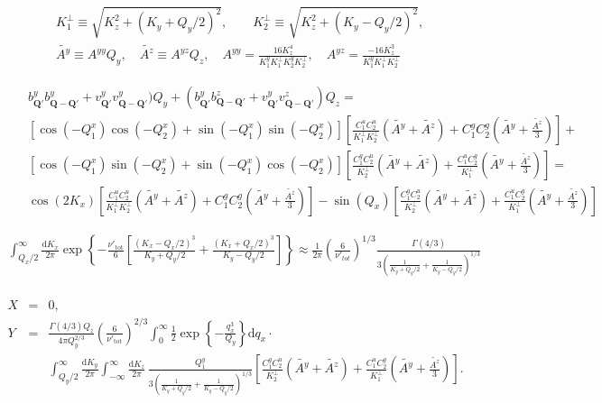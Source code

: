 \documentclass[prb,singlecolumn]{revtex4}
\begin{document}
\begin{eqnarray}
 && K_1^\perp \equiv \sqrt{K_z^2 + (K_y+Q_y/2)^2},\qquad  K_2^\perp \equiv \sqrt{K_z^2 + (K_y-Q_y/2)^2}, \\
 && \tilde{A^y} \equiv A^{yy}Q_y,\quad \tilde{A^z} \equiv A^{yz}Q_z,\quad A^{yy} = \frac{16K_z^4}{K_1^y K_1^\perp K_2^y K_2^\perp}   , \quad A^{yz} = \frac{-16K_z^3}{K_1^y K_1^\perp K_2^\perp}
\end{eqnarray}


\begin{eqnarray}
 && b_{\mathbf{Q}'}^yb_{\mathbf{Q}-\mathbf{Q}'}^y + v_{\mathbf{Q}'}^yv_{\mathbf{Q}-\mathbf{Q}'}^y)Q_y + (b_{\mathbf{Q}'}^yb_{\mathbf{Q}-\mathbf{Q}'}^z + v_{\mathbf{Q}'}^yv_{\mathbf{Q}-\mathbf{Q}'}^z)Q_z = \nonumber \\ 
 && \left[\cos(-Q_1^x)\cos(-Q_2^x) + \sin(-Q_1^x)\sin(-Q_2^x)\right]\left[\frac{C_1^u C_2^u}{K_1^\perp K_2^\perp}(\tilde{A^y} + \tilde{A^z}) + C_1^gC_2^g(\tilde{A^y} + \frac{\tilde{A^z}}3 ) \right] + \\
 && \left[\cos(-Q_1^x)\sin(-Q_2^x) + \sin(-Q_1^x)\cos(-Q_2^x)\right]\left[\frac{C_1^g C_2^u}{K_2^\perp}(\tilde{A^y} + \tilde{A^z}) + \frac{C_1^u C_2^g}{K_1^\perp}(\tilde{A^y} + \frac{\tilde{A^z}}3 ) \right] = \\
 && \cos(2K_x)\left[\frac{C_1^u C_2^u}{K_1^\perp K_2^\perp}(\tilde{A^y} + \tilde{A^z}) + C_1^gC_2^g(\tilde{A^y} + \frac{\tilde{A^z}}3 ) \right] -\sin(Q_x)\left[\frac{C_1^g C_2^u}{K_2^\perp}(\tilde{A^y} + \tilde{A^z}) + \frac{C_1^u C_2^g}{K_1^\perp}(\tilde{A^y} + \frac{\tilde{A^z}}3 ) \right]
 \end{eqnarray}


\begin{eqnarray}
  \int_{Q_x/2}^\infty \frac{\mathrm{d}K_x}{2\pi}  \exp\left\{ -\frac{\nu'_{\mathrm{tot}}}{6}\left[\frac{(K_x-Q_x/2)^3}{K_y+Q_y/2}+\frac{(K_x+Q_x/2)^3}{K_y-Q_y/2}\right]\right\} \approx \frac1{2\pi} \left( \frac{6}{\nu'_{tot}}  \right)^{1/3} \frac{\Gamma(4/3)}{3\left( \frac1{K_y + Q_y/2} + \frac1{K_y - Q_y/2} \right)^{1/3}} \nonumber \\ 
\end{eqnarray}

\begin{eqnarray*}
 X &=& 0,\nonumber \\
 Y &=& \frac{\Gamma(4/3)Q_z}{4\pi Q_y^{2/3}}\left(\frac6{\nu'_\mathrm{tot}}\right)^{2/3} \int_0^\infty \frac12 \exp\left\{-\frac{q_x^3}{Q_y} \right\} \mathrm{d}q_x \cdot \nonumber \\
 &&\int_{Q_y/2}^\infty \frac{\mathrm{d}K_y}{2\pi} \int_{-\infty}^\infty \frac{\mathrm{d}K_z}{2\pi} \, \frac{Q_1^y}{3\left( \frac1{K_y + Q_y/2} + \frac1{K_y - Q_y/2} \right)^{1/3}} 
 \left[\frac{C_1^g C_2^u}{K_2^\perp}(\tilde{A^y} + \tilde{A^z}) + \frac{C_1^u C_2^g}{K_1^\perp}(\tilde{A^y} + \frac{\tilde{A^z}}3 ) \right] .\nonumber
\end{eqnarray*}
\end{document}
